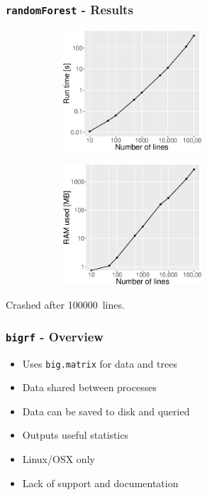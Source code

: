 \documentclass[11pt, compress]{beamer}
\begin{document}
\begin{frame}[fragile]
  \frametitle{\texttt{randomForest} - Results}
  \begin{figure}[ht]
    \begin{subfigure}[t]{0.49\textwidth}
        \centering
        \includegraphics[height=4.5cm]{rf_time.eps}
    \end{subfigure}%
    \begin{subfigure}[t]{0.49\textwidth}
        \centering
        \includegraphics[height=4.5cm]{rf_ram.eps}
    \end{subfigure}
\end{figure}

    Crashed after \SI{100000}{lines}.
  
 
\end{frame}

\begin{frame}[fragile]
  \frametitle{\texttt{bigrf} - Overview}
    

  \begin{itemize}
    \item Uses \texttt{big.matrix} for data and trees
    \item Data shared between processes
    \item Data can be saved to disk and queried
    \item Outputs useful statistics
    \item Linux/OSX only
    \item Lack of support and documentation
\end{itemize}
\end{frame}
\end{document}
